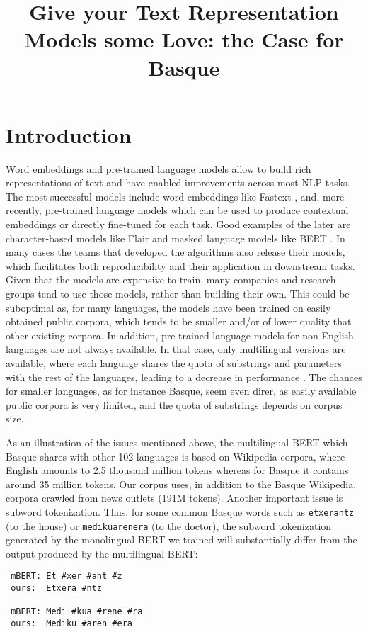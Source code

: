 \documentclass[10pt, a4paper]{article}
\title{Give your Text Representation Models some Love: the Case for Basque
}
\begin{document}
\maketitleabstract

\section{Introduction}\label{sec:introduction}

Word embeddings and pre-trained language models allow to build rich representations of text and have enabled improvements across most NLP tasks. The most successful models include word embeddings like Fastext \cite{fasttext1_bojanowski2017enriching}, and, more recently, pre-trained language models which can be used to produce contextual embeddings or directly fine-tuned for each task. Good examples of the later are character-based models like Flair \cite{akbik2018coling} and masked language models like BERT \cite{devlin2019bert}. In many cases the teams that developed the algorithms also release their models, which facilitates both reproducibility and their application in downstream tasks. Given that the models are expensive to train, many companies and research groups tend to use those models, rather than building their own. This could be suboptimal as, for many languages, the models have been trained on easily obtained public corpora, which tends to be smaller and/or of lower quality that other existing corpora. In addition, pre-trained language models for non-English languages are not always available. In that case, only multilingual versions are available, where each language shares the quota of substrings and parameters with the rest of the languages, leading to a decrease in performance \cite{devlin2019bert}.  The chances for smaller languages, as for instance Basque, seem even direr, as easily available public corpora is very limited, and the quota of substrings depends on corpus size.

As an illustration of the issues mentioned above, the multilingual BERT which Basque shares with other 102 languages is based on Wikipedia corpora, where English amounts to 2.5 thousand million tokens whereas for Basque it contains around 35 million tokens. Our corpus uses, in addition to the Basque Wikipedia, corpora crawled from news outlets (191M tokens). Another important issue is subword tokenization. Thus, for some common Basque words such as \texttt{etxerantz} (to the house) or \texttt{medikuarenera} (to the doctor), the subword tokenization generated by the monolingual BERT we trained will substantially differ from the output produced by the multilingual BERT:

\begin{verbatim}
 mBERT: Et #xer #ant #z
 ours:  Etxera #ntz

 mBERT: Medi #kua #rene #ra
 ours:  Mediku #aren #era
\end{verbatim}
\end{document}
